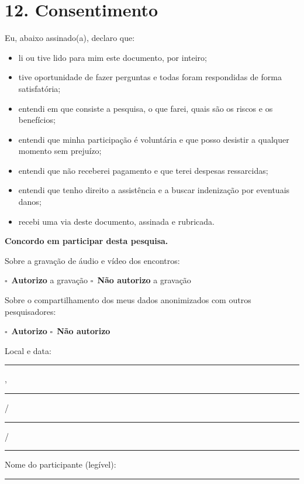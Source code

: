 \documentclass[12pt,a4paper]{article}
\newcommand{\linha}[1]{\rule{#1}{0.4pt}}
\newcommand{\cx}{$\square$~}
\begin{document}
\section*{12. Consentimento}

Eu, abaixo assinado(a), declaro que:

\begin{itemize}
  \item li ou tive lido para mim este documento, por inteiro;
  \item tive oportunidade de fazer perguntas e todas foram respondidas de forma satisfatória;
  \item entendi em que consiste a pesquisa, o que farei, quais são os riscos e os benefícios;
  \item entendi que minha participação é voluntária e que posso desistir a qualquer momento sem prejuízo;
  \item entendi que não receberei pagamento e que terei despesas ressarcidas;
  \item entendi que tenho direito a assistência e a buscar indenização por eventuais danos;
  \item recebi uma via deste documento, assinada e rubricada.
\end{itemize}

\textbf{Concordo em participar desta pesquisa.}

\vspace{6pt}
\noindent Sobre a gravação de áudio e vídeo dos encontros:

\noindent\cx \textbf{Autorizo} a gravação \hspace{2cm} \cx \textbf{Não autorizo} a gravação

\vspace{6pt}
\noindent Sobre o compartilhamento dos meus dados anonimizados com outros
pesquisadores:

\noindent\cx \textbf{Autorizo} \hspace{2cm} \cx \textbf{Não autorizo}

\vspace{16pt}

\noindent Local e data: \linha{6cm}, \linha{1.2cm} / \linha{1.2cm} / \linha{2cm}

\vspace{18pt}

\noindent Nome do participante (legível): \linha{9cm}

\vspace{14pt}
\end{document}
